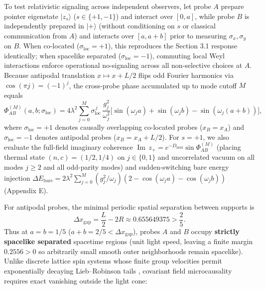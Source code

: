 \documentclass[11pt,letterpaper]{article}
\theoremstyle{definition}
\begin{document}
To test relativistic signaling across independent observers, let probe
\(A\) prepare pointer eigenstate \(|z_s\rangle\) (\(s \in \{+1, -1\}\))
and interact over \([0, a]\), while probe \(B\) is independently
prepared in \(|+\rangle\) (without conditioning on \(s\) or classical
communication from \(A\)) and interacts over \([a, a+b]\) prior to
measuring \(\sigma_x, \sigma_y\) on \(B\). When co-located
(\(\sigma_{\mathrm{loc}} = +1\)), this reproduces the Section 3.1
response identically; when spacelike separated
(\(\sigma_{\mathrm{loc}} = -1\)), commuting local Weyl interactions
enforce operational no-signaling across all non-selective choices at
\(A\). Because antipodal translation \(x \mapsto x + L/2\) flips odd
Fourier harmonics via \(\cos(\pi j) = (-1)^j\), the cross-probe phase
accumulated up to mode cutoff \(M\) equals
\[\Phi_{AB}^{(M)}(a, b; \sigma_{\mathrm{loc}}) = 4\lambda^2 \sum_{j=0}^{M} \sigma_{\mathrm{loc}}^{\,j}\,\frac{g_j^2}{\omega_j^2}\Big[\sin(\omega_j a) + \sin(\omega_j b) - \sin(\omega_j(a + b))\Big],
\tag{29}\] where \(\sigma_{\mathrm{loc}} = +1\) denotes causally
overlapping co-located probes (\(x_B = x_A\)) and
\(\sigma_{\mathrm{loc}} = -1\) denotes antipodal probes
(\(x_B = x_A + L/2\)). For \(s=+1\), we also evaluate the full-field
imaginary coherence
\(\operatorname{Im}\,z_+ = e^{-D_{\mathrm{field}}}\sin\Phi_{AB}^{(M)}\)
(placing thermal state \((n, c) = (1/2, 1/4)\) on \(j \in \{0, 1\}\) and
uncorrelated vacuum on all modes \(j \ge 2\) and all odd-parity modes)
and sudden-switching bare energy injection
\(\Delta E_{\mathrm{bare}} = 2\lambda^2 \sum_{j=0}^{M} (g_j^2/\omega_j)(2 - \cos(\omega_j a) - \cos(\omega_j b))\)
(Appendix E).

For antipodal probes, the minimal periodic spatial separation between
supports is
\[\Delta x_{\mathrm{gap}} = \frac{L}{2} - 2R \approx 0.655649375 > \frac{2}{5}.
\tag{30}\] Thus at \(a = b = 1/5\)
(\(a + b = 2/5 < \Delta x_{\mathrm{gap}}\)), probes \(A\) and \(B\)
occupy \textbf{strictly spacelike separated} spacetime regions (unit
light speed, leaving a finite margin \(0.2556 > 0\) so arbitrarily small
smooth outer neighborhoods remain spacelike). Unlike discrete lattice
spin systems whose finite group velocities permit exponentially decaying
Lieb--Robinson tails \citep{liebRobinson1972}, covariant field
microcausality requires exact vanishing outside the light cone:
\end{document}
